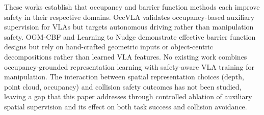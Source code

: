 These works establish that occupancy and barrier function methods each improve safety in their respective domains. OccVLA validates occupancy-based auxiliary supervision for VLAs but targets autonomous driving rather than manipulation safety. OGM-CBF and Learning to Nudge demonstrate effective barrier function designs but rely on hand-crafted geometric inputs or object-centric decompositions rather than learned VLA features. No existing work combines occupancy-grounded representation learning with safety-aware VLA training for manipulation. The interaction between spatial representation choices (depth, point cloud, occupancy) and collision safety outcomes has not been studied, leaving a gap that this paper addresses through controlled ablation of auxiliary spatial supervision and its effect on both task success and collision avoidance.

